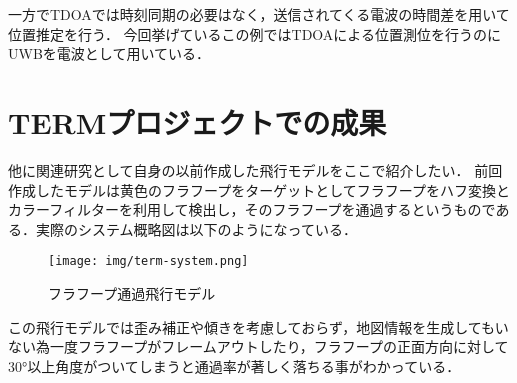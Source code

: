 一方でTDOAでは時刻同期の必要はなく，送信されてくる電波の時間差を用いて位置推定を行う．
今回挙げているこの例ではTDOAによる位置測位を行うのにUWBを電波として用いている．


\section{TERMプロジェクトでの成果}
他に関連研究として自身の以前作成した飛行モデルをここで紹介したい．
前回作成したモデルは黄色のフラフープをターゲットとしてフラフープをハフ変換とカラーフィルターを利用して検出し，そのフラフープを通過するというものである．実際のシステム概略図は以下のようになっている．

\begin{figure}[htbp]
  \begin{center}
    \texttt{[image: img/term-system.png]}
    \caption{フラフープ通過飛行モデル}
    \label{fig:hoop}
  \end{center}
\end{figure}

この飛行モデルでは歪み補正や傾きを考慮しておらず，地図情報を生成してもいない為一度フラフープがフレームアウトしたり，フラフープの正面方向に対して30°以上角度がついてしまうと通過率が著しく落ちる事がわかっている．



